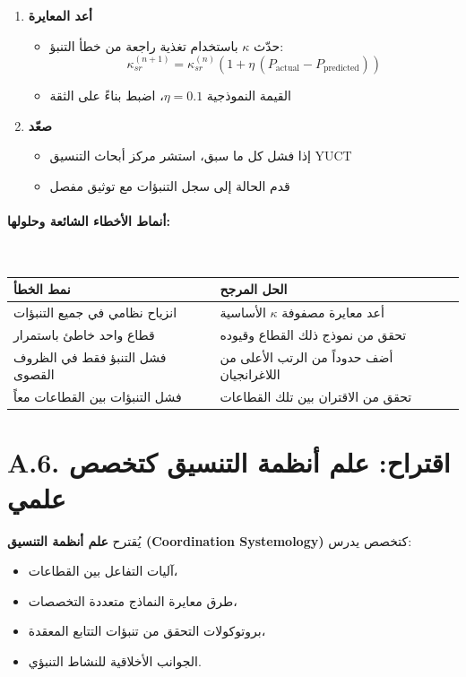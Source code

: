 \documentclass[13pt,a4paper]{article}
\begin{document}
\begin{enumerate}
		\item \textbf{أعد المعايرة}
		\begin{itemize}
			\item حدّث $\kappa$ باستخدام تغذية راجعة من خطأ التنبؤ:
			\[
			\kappa_{sr}^{(n+1)} = \kappa_{sr}^{(n)}\left(1+\eta\,(P_{\mathrm{actual}}-P_{\mathrm{predicted}})\right)
			\]
			\item القيمة النموذجية $\eta = 0.1$، اضبط بناءً على الثقة
		\end{itemize}
		
		\item \textbf{صعّد}
		\begin{itemize}
			\item إذا فشل كل ما سبق، استشر مركز أبحاث التنسيق YUCT
			\item قدم الحالة إلى سجل التنبؤات مع توثيق مفصل
		\end{itemize}
	\end{enumerate}
	
	\paragraph*{أنماط الأخطاء الشائعة وحلولها:} \
	
	\begin{tabularx}{\textwidth}{|l|X|}
		\hline
		\textbf{نمط الخطأ} & \textbf{الحل المرجح} \\
		\hline
		انزياح نظامي في جميع التنبؤات & أعد معايرة مصفوفة $\kappa$ الأساسية \\
		\hline
		قطاع واحد خاطئ باستمرار & تحقق من نموذج ذلك القطاع وقيوده \\
		\hline
		فشل التنبؤ فقط في الظروف القصوى & أضف حدوداً من الرتب الأعلى من اللاغرانجيان \\
		\hline
		فشل التنبؤات بين القطاعات معاً & تحقق من الاقتران بين تلك القطاعات \\
		\hline
	\end{tabularx}
	
	\section*{A.6. اقتراح: علم أنظمة التنسيق كتخصص علمي}
	
	يُقترح \textbf{علم أنظمة التنسيق (Coordination Systemology)} كتخصص يدرس:
	\begin{itemize}[leftmargin=*]
		\item آليات التفاعل بين القطاعات،
		\item طرق معايرة النماذج متعددة التخصصات،
		\item بروتوكولات التحقق من تنبؤات التتابع المعقدة،
		\item الجوانب الأخلاقية للنشاط التنبؤي.
	\end{itemize}
	
\end{document}
